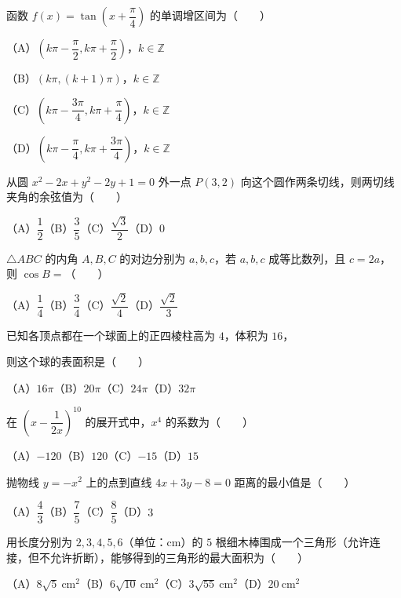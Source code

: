 \begin{question}
函数 $f(x)=\tan\left(x+\dfrac\pi4\right)$ 的单调增区间为\mbox{（　　）}

（A）$\left(k\pi-\dfrac\pi2,k\pi+\dfrac\pi2\right)$，$k\in\mathbb Z$

（B）$(k\pi,(k+1)\pi)$，$k\in\mathbb Z$

（C）$\left(k\pi-\dfrac{3\pi}4,k\pi+\dfrac\pi4\right)$，$k\in\mathbb Z$

（D）$\left(k\pi-\dfrac\pi4,k\pi+\dfrac{3\pi}4\right)$，$k\in\mathbb Z$

\end{question}
\begin{question}
从圆 $x^2-2x+y^2-2y+1=0$ 外一点 $P(3,2)$ 向这个圆作两条切线，则两切线夹角的余弦值为\mbox{（　　）}

（A）$\dfrac12$\quad（B）$\dfrac35$\quad（C）$\dfrac{\sqrt3}2$\quad（D）$0$

\end{question}
\begin{question}
$\triangle ABC$ 的内角 $A,B,C$ 的对边分别为 $a,b,c$，若 $a,b,c$ 成等比数列，且 $c=2a$，则 $\cos B=$\mbox{（　　）}

（A）$\dfrac14$\quad（B）$\dfrac34$\quad（C）$\dfrac{\sqrt2}4$\quad（D）$\dfrac{\sqrt2}3$

\end{question}
\begin{question}
已知各顶点都在一个球面上的正四棱柱高为 $4$，体积为 $16$，

则这个球的表面积是\mbox{（　　）}

（A）$16\pi$\quad（B）$20\pi$\quad（C）$24\pi$\quad（D）$32\pi$

\end{question}
\begin{question}
在 $\left(x-\dfrac1{2x}\right)^{10}$ 的展开式中，$x^4$ 的系数为\mbox{（　　）}

（A）$-120$\quad（B）$120$\quad（C）$-15$\quad（D）$15$

\end{question}
\begin{question}
抛物线 $y=-x^2$ 上的点到直线 $4x+3y-8=0$ 距离的最小值是\mbox{（　　）}

（A）$\dfrac43$\quad（B）$\dfrac75$\quad（C）$\dfrac85$\quad（D）$3$

\end{question}
\begin{question}
用长度分别为 $2,3,4,5,6$（单位：cm）的 $5$ 根细木棒围成一个三角形（允许连接，但不允许折断），能够得到的三角形的最大面积为\mbox{（　　）}

（A）$8\sqrt5\ \mathrm{cm}^2$\quad（B）$6\sqrt{10}\ \mathrm{cm}^2$\quad（C）$3\sqrt{55}\ \mathrm{cm}^2$\quad（D）$20\ \mathrm{cm}^2$

\end{question}

